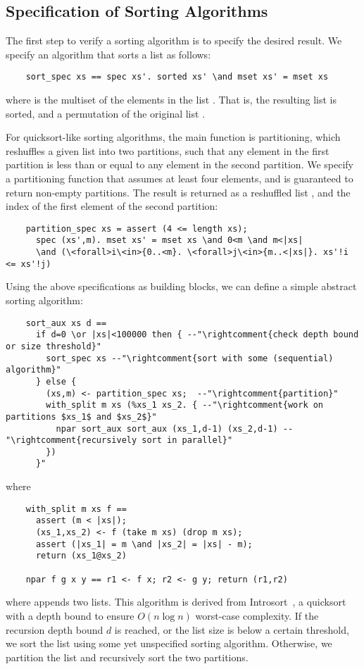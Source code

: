 \documentclass[runningheads]{llncs}
\begin{document}
  \subsection{Specification of Sorting Algorithms}\label{sec:sortspec}
  The first step to verify a sorting algorithm is to specify the desired result.
  We specify an algorithm that sorts a list  as follows:
  \begin{lstlisting}
    sort_spec xs == spec xs'. sorted xs' \and mset xs' = mset xs
  \end{lstlisting}
  where  is the multiset of the elements in the list .
  That is, the resulting list  is sorted, and a permutation of the original list .

  For quicksort-like sorting algorithms, the main function is partitioning, which reshuffles a
  given list into two partitions, such that any element in the first partition is less than or equal
  to any element in the second partition. We specify a partitioning function that assumes at least four elements,
  and is guaranteed to return non-empty partitions. The result is returned as a reshuffled list ,
  and the index  of the first element of the second partition:
  \begin{lstlisting}
    partition_spec xs = assert (4 <= length xs);
      spec (xs',m). mset xs' = mset xs \and 0<m \and m<|xs|
      \and (\<forall>i\<in>{0..<m}. \<forall>j\<in>{m..<|xs|}. xs'!i <= xs'!j)
  \end{lstlisting}

  Using the above specifications as building blocks, we can define a simple abstract sorting algorithm:
  \begin{lstlisting}
    sort_aux xs d ==
      if d=0 \or |xs|<100000 then { --"\rightcomment{check depth bound or size threshold}"
        sort_spec xs --"\rightcomment{sort with some (sequential) algorithm}"
      } else {
        (xs,m) <- partition_spec xs;  --"\rightcomment{partition}"
        with_split m xs (%xs_1 xs_2. { --"\rightcomment{work on partitions $xs_1$ and $xs_2$}"
          npar sort_aux sort_aux (xs_1,d-1) (xs_2,d-1) --"\rightcomment{recursively sort in parallel}"
        })
      }"
  \end{lstlisting}
  where
  \begin{lstlisting}
    with_split m xs f ==
      assert (m < |xs|);
      (xs_1,xs_2) <- f (take m xs) (drop m xs);
      assert (|xs_1| = m \and |xs_2| = |xs| - m);
      return (xs_1@xs_2)

    npar f g x y == r1 <- f x; r2 <- g y; return (r1,r2)
  \end{lstlisting}
  where  appends two lists.
  This algorithm is derived from Introsort~\cite{Muss97}, a quicksort with a depth bound to ensure $O(n\log n)$ worst-case complexity.
  If the recursion depth bound $d$ is reached, or the list size is below a certain threshold,
  we sort the list using some yet unspecified sorting algorithm. Otherwise, we partition the list
  and recursively sort the two partitions.
\end{document}
